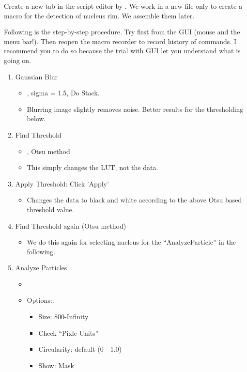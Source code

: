Create a new tab in the script editor by . We work in a new file only to create a macro for the detection of nucleus rim. We assemble them later. 

Following is the step-by-step procedure. Try first from the GUI (mouse and the menu bar!). Then reopen the macro recorder to record history of commands. I recommend you to do so because the trial with GUI let you understand what is going on.  

\begin{enumerate}
  \item Gaussian Blur
  \begin{itemize}
    \item {}, sigma = 1.5, Do Stack.
    \item Blurring image slightly removes noise. Better results for the thresholding below.  
  \end{itemize}
  \item Find Threshold
  \begin{itemize}
    \item {},  Otsu method
    \item This simply changes the LUT, not the data. 
  \end{itemize}
  \item Apply Threshold: Click 'Apply'
  \begin{itemize}
    \item Changes the data to black and white according to the above Otsu based threshold value. 
  \end{itemize}
  \item Find Threshold again (Otsu method)
  \begin{itemize}
    \item We do this again for selecting nucleus for the ``AnalyzeParticle'' in the following.
  \end{itemize}
  \item Analyze Particles
  \begin{itemize}
    \item {}
    \item Options::
    \begin{itemize}
      \item Size: 800-Infinity
      \item Check ``Pixle Units''
      \item Circularity: default (0 - 1.0)
      \item Show: Mask

\end{itemize}
\end{itemize}
\end{enumerate}
